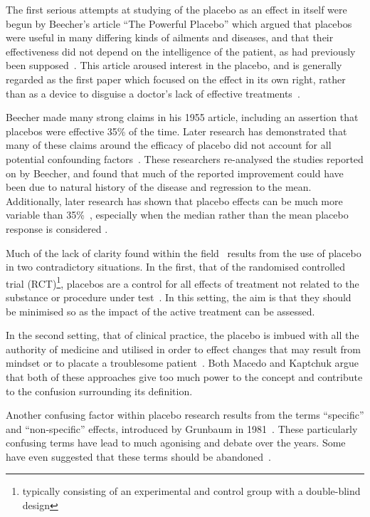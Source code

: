 The first serious attempts at studying of the placebo as an effect in itself  were begun by Beecher's article ``The Powerful Placebo'' which argued that placebos were useful in many differing kinds of ailments and diseases, and that their effectiveness did not depend on the intelligence of the patient, as had previously been supposed~\cite{beecher1955powerful}.  This article aroused interest in the placebo, and is generally regarded as the first paper which focused on the effect in its own right, rather than as a device to disguise a doctor's lack of effective treatments~\cite{beecher1955powerful,Kaptchuk1998}. 

Beecher made many strong claims in his 1955 article, including an assertion that placebos were effective 35\% of the time. Later research has demonstrated that many of these claims around the efficacy of placebo did not account for all potential confounding factors~\cite{Kienle1998}. These researchers re-analysed the studies reported on by Beecher, and found that much of the reported improvement could have been due to natural history of the disease and regression to the mean. Additionally, later research has shown that placebo effects can be much more variable than 35\%~\cite{Turner1994}, especially when the median rather than the mean placebo response is considered \cite{McQuay1996}.   

Much of the lack of clarity found within the field~\cite{Macedo2003,Kaptchuk1998} results from the use of placebo in two contradictory situations. In the first, that of the randomised controlled trial (RCT)\footnote{typically consisting of an experimental and control group with a double-blind design}, placebos are a control for all effects of treatment not related to the substance or procedure under test~\cite{Vickers2000}. In this setting, the aim is that they should be minimised so as the impact of the active treatment can be assessed.  

In the second setting, that  of clinical practice, the placebo is imbued with all the authority of medicine and utilised in order to effect changes that may result from mindset or to placate a troublesome patient~\cite{Bootzin2003,Sherman2008}. Both Macedo and Kaptchuk argue that both of these approaches give too much power to the concept and contribute to the confusion surrounding its definition. 

Another confusing factor within placebo research results from the terms ``specific'' and ``non-specific'' effects, introduced by Grunbaum in 1981~\cite{grunbaum1981placebo}. These particularly confusing terms have lead to much agonising and debate over the years. Some have even suggested that these terms should be abandoned~\cite{Caspi2002}. 

